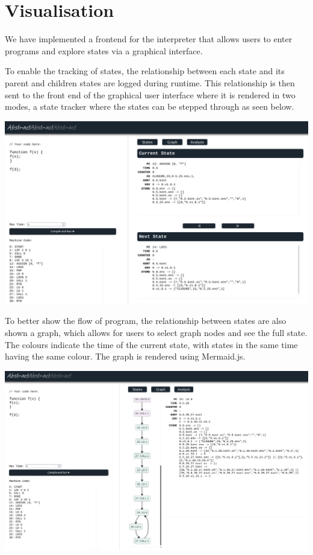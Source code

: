 \documentclass[12pt]{article}
\begin{document}
\section{Visualisation}
We have implemented a frontend for the interpreter that allows users to enter programs and explore states via a graphical interface.

To enable the tracking of states, the relationship between each state and its parent and children states are logged during runtime. This relationship is then sent to the front end of the graphical user interface where it is rendered in two modes, a state tracker where the states can be stepped through as seen below.

\includegraphics[scale=0.1]{ss1.png}

To better show the flow of program, the relationship between states are also shown a graph, which allows for users to select graph nodes and see the full state. The colours indicate the time of the current state, with states in the same time having the same colour. The graph is rendered using Mermaid.js.

\includegraphics[scale=0.1]{ss2.png}
\end{document}
